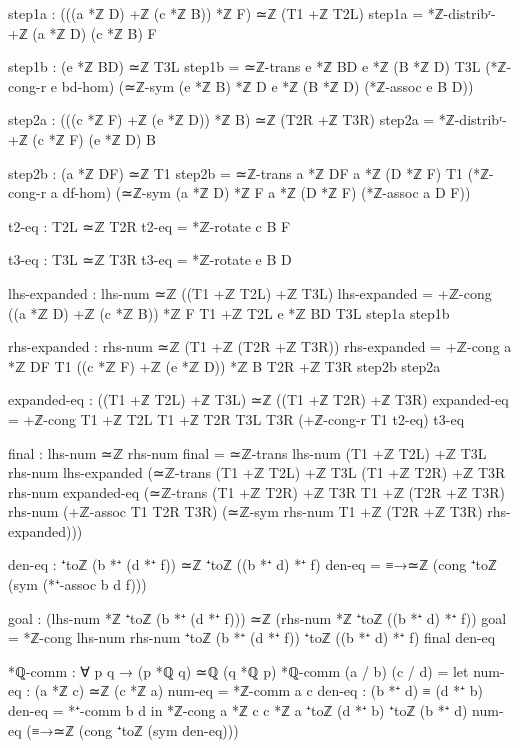 \documentclass[11pt,a4paper]{book}
\begin{document}
\begin{code}
    step1a : (((a *ℤ D) +ℤ (c *ℤ B)) *ℤ F) ≃ℤ (T1 +ℤ T2L)
    step1a = *ℤ-distribʳ-+ℤ (a *ℤ D) (c *ℤ B) F

    step1b : (e *ℤ BD) ≃ℤ T3L
    step1b = ≃ℤ-trans {e *ℤ BD} {e *ℤ (B *ℤ D)} {T3L}
              (*ℤ-cong-r e bd-hom)
              (≃ℤ-sym {(e *ℤ B) *ℤ D} {e *ℤ (B *ℤ D)} (*ℤ-assoc e B D))

    step2a : (((c *ℤ F) +ℤ (e *ℤ D)) *ℤ B) ≃ℤ (T2R +ℤ T3R)
    step2a = *ℤ-distribʳ-+ℤ (c *ℤ F) (e *ℤ D) B

    step2b : (a *ℤ DF) ≃ℤ T1
    step2b = ≃ℤ-trans {a *ℤ DF} {a *ℤ (D *ℤ F)} {T1}
              (*ℤ-cong-r a df-hom)
              (≃ℤ-sym {(a *ℤ D) *ℤ F} {a *ℤ (D *ℤ F)} (*ℤ-assoc a D F))

    t2-eq : T2L ≃ℤ T2R
    t2-eq = *ℤ-rotate c B F
    
    t3-eq : T3L ≃ℤ T3R
    t3-eq = *ℤ-rotate e B D

    lhs-expanded : lhs-num ≃ℤ ((T1 +ℤ T2L) +ℤ T3L)
    lhs-expanded = +ℤ-cong {((a *ℤ D) +ℤ (c *ℤ B)) *ℤ F} {T1 +ℤ T2L} {e *ℤ BD} {T3L} 
                    step1a step1b

    rhs-expanded : rhs-num ≃ℤ (T1 +ℤ (T2R +ℤ T3R))
    rhs-expanded = +ℤ-cong {a *ℤ DF} {T1} {((c *ℤ F) +ℤ (e *ℤ D)) *ℤ B} {T2R +ℤ T3R}
                    step2b step2a

    expanded-eq : ((T1 +ℤ T2L) +ℤ T3L) ≃ℤ ((T1 +ℤ T2R) +ℤ T3R)
    expanded-eq = +ℤ-cong {T1 +ℤ T2L} {T1 +ℤ T2R} {T3L} {T3R}
                   (+ℤ-cong-r T1 t2-eq) t3-eq

    final : lhs-num ≃ℤ rhs-num
    final = ≃ℤ-trans {lhs-num} {(T1 +ℤ T2L) +ℤ T3L} {rhs-num} lhs-expanded
            (≃ℤ-trans {(T1 +ℤ T2L) +ℤ T3L} {(T1 +ℤ T2R) +ℤ T3R} {rhs-num} expanded-eq
            (≃ℤ-trans {(T1 +ℤ T2R) +ℤ T3R} {T1 +ℤ (T2R +ℤ T3R)} {rhs-num} 
              (+ℤ-assoc T1 T2R T3R)
              (≃ℤ-sym {rhs-num} {T1 +ℤ (T2R +ℤ T3R)} rhs-expanded)))

    den-eq : ⁺toℤ (b *⁺ (d *⁺ f)) ≃ℤ ⁺toℤ ((b *⁺ d) *⁺ f)
    den-eq = ≡→≃ℤ (cong ⁺toℤ (sym (*⁺-assoc b d f)))

    goal : (lhs-num *ℤ ⁺toℤ (b *⁺ (d *⁺ f))) ≃ℤ (rhs-num *ℤ ⁺toℤ ((b *⁺ d) *⁺ f))
    goal = *ℤ-cong {lhs-num} {rhs-num} {⁺toℤ (b *⁺ (d *⁺ f))} {⁺toℤ ((b *⁺ d) *⁺ f)}
             final den-eq

*ℚ-comm : ∀ p q → (p *ℚ q) ≃ℚ (q *ℚ p)
*ℚ-comm (a / b) (c / d) =
  let num-eq : (a *ℤ c) ≃ℤ (c *ℤ a)
      num-eq = *ℤ-comm a c
      den-eq : (b *⁺ d) ≡ (d *⁺ b)
      den-eq = *⁺-comm b d
  in *ℤ-cong {a *ℤ c} {c *ℤ a} {⁺toℤ (d *⁺ b)} {⁺toℤ (b *⁺ d)}
             num-eq (≡→≃ℤ (cong ⁺toℤ (sym den-eq)))


\end{code}
\end{document}
